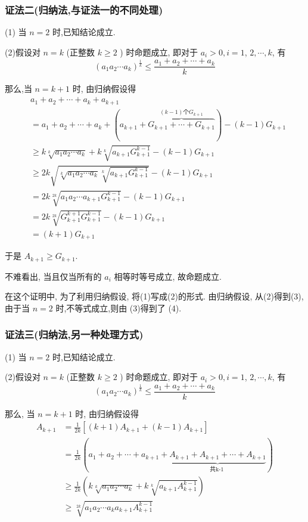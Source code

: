 \subsubsection*{证法二(归纳法,与证法一的不同处理)}

(1) 当 $n=2$ 时,已知结论成立.

(2)假设对 $n=k$ (正整数 $k \geqslant 2$ ) 时命题成立, 即对于 $a_{i}>0, i=1$, $2, \cdots, k$, 有
$$
\left(a_{1} a_{2} \cdots a_{k}\right)^{\frac{1}{k}} \leqslant \frac{a_{1}+a_{2}+\cdots+a_{k}}{k}
$$

那么,当 $n=k+1$ 时, 由归纳假设得
\begin{align*}
& a_{1}+a_{2}+\cdots+a_{k}+a_{k+1}  \tag{1}\\
& =a_{1}+a_{2}+\cdots+a_{k}+(a_{k+1}+\overbrace{G_{k+1}+\cdots+G_{k+1}}^{(k-1) \text{个} G_{k+1}})-(k-1) G_{k+1}  \tag{2}\\
& \geqslant k \sqrt[k]{a_{1} a_{2} \cdots a_{k}}+k \sqrt[k]{a_{k+1} G_{k+1}^{k-1}}-(k-1) G_{k+1}  \tag{3}\\
& \geqslant 2 k \sqrt{\sqrt[k]{a_{1} a_{2} \cdots a_{k}} \sqrt[k]{a_{k+1} G_{k+1}^{k-1}}}-(k-1) G_{k+1}  \tag{4}\\
& =2 k \sqrt[2 k]{a_{1} a_{2} \cdots a_{k+1} G_{k+1}^{k-1}}-(k-1) G_{k+1}  \tag{5}\\
& =2 k \sqrt[2 k]{G_{k+1}^{k+1} G_{k+1}^{k-1}}-(k-1) G_{k+1}  \tag{6}\\
& =(k+1) G_{k+1} \tag{7}
\end{align*}

于是 $A_{k+1} \geqslant G_{k+1}$.

不难看出, 当且仅当所有的 $a_{i}$ 相等时等号成立, 故命题成立.
\begin{note}
在这个证明中, 为了利用归纳假设, 将(1)写成(2)的形式. 由归纳假设, 从(2)得到(3),由于当 $n=2$ 时,不等式成立,则由 (3)得到了 (4).
\end{note}

\subsubsection*{证法三(归纳法,另一种处理方式)}

(1) 当 $n=2$ 时,已知结论成立.

(2)假设对 $n=k$ (正整数 $k \geqslant 2$ ) 时命题成立, 即对于 $a_{i}>0, i=1$, $2, \cdots, k$, 有
$$
\left(a_{1} a_{2} \cdots a_{k}\right)^{\frac{1}{k}} \leqslant \frac{a_{1}+a_{2}+\cdots+a_{k}}{k}
$$

那么, 当 $n=k+1$ 时, 由归纳假设得
$$
\begin{aligned}
A_{k+1} & =\frac{1}{2 k}\left[(k+1) A_{k+1}+(k-1) A_{k+1}\right] \\
& =\frac{1}{2 k}(a_{1}+a_{2}+\cdots+a_{k+1}+\underbrace{A_{k+1}+A_{k+1}+\cdots+A_{k+1}}_{\text {共k-1 }}) \\
& \geqslant \frac{1}{2 k}\left(k \sqrt[k]{a_{1} a_{2} \cdots a_{k}}+k \sqrt[k]{a_{k+1} A_{k+1}^{k-1}}\right) \\
& \geqslant \sqrt[2 k]{a_{1} a_{2} \cdots a_{k} a_{k+1} A_{k+1}^{k-1}}
\end{aligned}
$$

